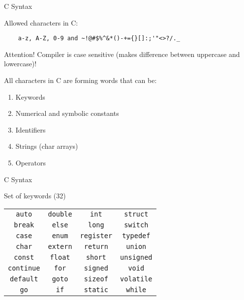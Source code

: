 \begin{frame}[fragile]{C Syntax}

  \begin{block}{Allowed characters in C:}
  \begin{verbatim}
    a-z, A-Z, 0-9 and ~!@#$%^&*()-+={}[]:;'"<>?/._  
  \end{verbatim}
  \end{block}

    \begin{alertblock}{Attention!}
    Compiler is case sensitive (makes difference between uppercase and lowercase)!
    \end{alertblock}

    All characters in C are forming words that can be:
    \begin{enumerate}
    \item Keywords
    \item Numerical and symbolic constants
    \item Identifiers
    \item Strings (char arrays)
    \item Operators
    \end{enumerate}

\end{frame}

\begin{frame}{C Syntax}

    \begin{block}{Set of keywords (32)}

    \begin{tabular}{c c c c}
        \texttt{auto} & \texttt{double} & \texttt{int} & \texttt{struct} \\
        \texttt{break} & \texttt{else} & \texttt{long} & \texttt{switch} \\
        \texttt{case} & \texttt{enum} & \texttt{register} & \texttt{typedef} \\
        \texttt{char} & \texttt{extern} & \texttt{return} & \texttt{union} \\
        \texttt{const} & \texttt{float} & \texttt{short} & \texttt{unsigned} \\
        \texttt{continue} & \texttt{for} & \texttt{signed} & \texttt{void} \\
        \texttt{default} & \texttt{goto} & \texttt{sizeof} & \texttt{volatile} \\
        \texttt{go} & \texttt{if} & \texttt{static} & \texttt{while}
    \end{tabular}
    \end{block}
\end{frame}

